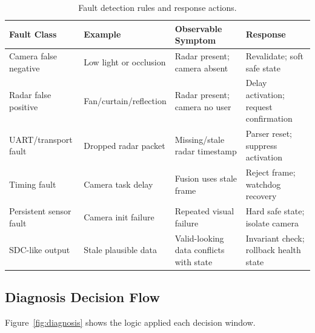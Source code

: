 \documentclass[12pt]{extarticle}
\begin{document}
\begin{table}[H]
\centering
\caption{Fault detection rules and response actions.}
\label{tab:faultmodel}
\small
\begin{tabular}{p{2.8cm}p{2.6cm}p{3.0cm}p{3.4cm}}
\toprule
\textbf{Fault Class} & \textbf{Example} & \textbf{Observable Symptom} & \textbf{Response}\\
\midrule
Camera false negative & Low light or occlusion & Radar present; camera absent & Revalidate; soft safe state\\
Radar false positive & Fan/curtain/reflection & Radar present; camera no user & Delay activation; request confirmation\\
UART/transport fault & Dropped radar packet & Missing/stale radar timestamp & Parser reset; suppress activation\\
Timing fault & Camera task delay & Fusion uses stale frame & Reject frame; watchdog recovery\\
Persistent sensor fault & Camera init failure & Repeated visual failure & Hard safe state; isolate camera\\
SDC-like output & Stale plausible data & Valid-looking data conflicts with state & Invariant check; rollback health state\\
\bottomrule
\end{tabular}
\end{table}

\subsection{Diagnosis Decision Flow}

Figure~\ref{fig:diagnosis} shows the logic applied each decision window.
\end{document}
